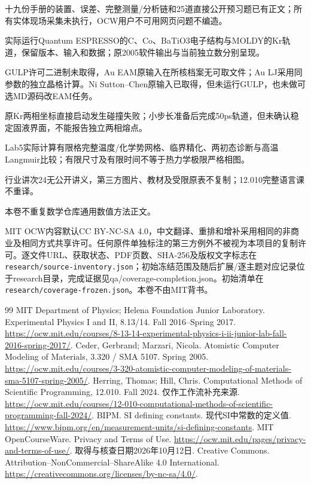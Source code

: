 十九份手册的装置、误差、完整测量/分析链和25道直接公开预习题已有正文；所有实体现场采集未执行，OCW用户不可用网页问题不编造。\par
实际运行Quantum ESPRESSO的C、Co、BaTiO3电子结构与MOLDY的Kr轨道，保留版本、输入和数据；原2005软件输出与当前独立数分别呈现。\par
GULP许可二进制未取得，Au EAM原输入在所核档案无可取文件；Au LJ采用同参数的独立晶格计算。Ni Sutton--Chen原输入已取得，但未运行GULP，也未做可选MD源码改EAM任务。\par
原Kr两相坐标直接启动发生碰撞失败；小步长准备后完成50ps轨道，但未确认稳定固液界面，不能报告独立两相熔点。\par
Lab5实际计算有限格完整温度/化学势网格、临界精化、两初态诊断与高温Langmuir比较；有限尺寸及有限时间不等于热力学极限严格相图。\par
行业讲次24无公开讲义，第三方图片、教材及受限原表不复制；12.010完整语言课不重译。\par
本卷不重复数学仓库通用数值方法正文。\par
{}
MIT OCW内容默认CC BY-NC-SA 4.0，中文翻译、重排和增补采用相同的非商业及相同方式共享许可。任何原件单独标注的第三方例外不被视为本项目的复制许可。逐文件URL、获取状态、PDF页数、SHA-256及版权文字标志在 \texttt{research/source-inventory.json}；初始冻结范围及随后扩展/逐主题对应记录位于research目录，完成证据见qa/coverage-completion.json。初始清单在 \texttt{research/coverage-frozen.json}。本卷不由MIT背书。
\begin{thebibliography}{99}
 MIT Department of Physics; Helena Foundation Junior Laboratory. Experimental Physics I and II, 8.13/14. Fall 2016--Spring 2017. \url{https://ocw.mit.edu/courses/8-13-14-experimental-physics-i-ii-junior-lab-fall-2016-spring-2017/}.
 Ceder, Gerbrand; Marzari, Nicola. Atomistic Computer Modeling of Materials, 3.320 / SMA 5107. Spring 2005. \url{https://ocw.mit.edu/courses/3-320-atomistic-computer-modeling-of-materials-sma-5107-spring-2005/}.
 Herring, Thomas; Hill, Chris. Computational Methods of Scientific Programming, 12.010. Fall 2024. 仅作工作流补充来源. \url{https://ocw.mit.edu/courses/12-010-computational-methods-of-scientific-programming-fall-2024/}.
 BIPM. SI defining constants. 现代SI中常数的定义值. \url{https://www.bipm.org/en/measurement-units/si-defining-constants}.
 MIT OpenCourseWare. Privacy and Terms of Use. \url{https://ocw.mit.edu/pages/privacy-and-terms-of-use/}. 取得与核查日期2026年10月12日.
 Creative Commons. Attribution--NonCommercial--ShareAlike 4.0 International. \url{https://creativecommons.org/licenses/by-nc-sa/4.0/}.
\end{thebibliography}
